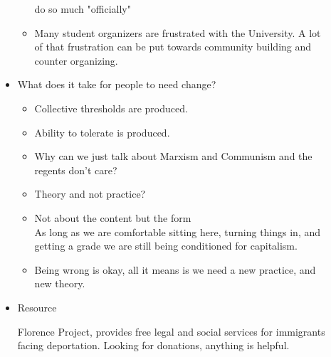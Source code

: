\documentclass{report}
\begin{document}
\begin{description}
\begin{itemize}
\begin{itemize}
                        do so much "officially"
                    \item Many student organizers are frustrated with the
                        University. A lot of that frustration can be
                        put towards community building and counter
                        organizing.
                \end{itemize}
            \item What does it take for people to need change?
                \begin{itemize}
                    \item Collective thresholds are produced.
                    \item Ability to tolerate is produced.
                    \item Why can we just talk about Marxism and Communism
                        and the regents don't care?
                    \item Theory and not practice?
                    \item Not about the content but the form\\
                        As long as we are comfortable sitting here,
                        turning things in, and getting a grade we are
                        still being conditioned for capitalism.
                    \item Being wrong is okay, all it means is we need
                        a new practice, and new theory.
                \end{itemize}
                \pagebreak
            \item Resource
                \begin{mdframed}
                    Florence Project, provides free legal and social
                    services for immigrants facing deportation. Looking
                    for donations, anything is helpful.
                \end{mdframed}
        \end{itemize}
\end{description}
\end{document}
